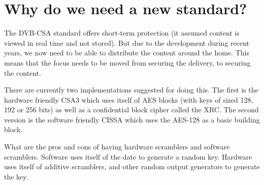 \section{Why do we need a new standard?}
The DVB-CSA standard offers short-term protection (it assumed content is viewed 
in real time and not stored). But due to the development during recent years, 
we now need to be able to distribute the content around the home. This means 
that the focus needs to be moved from securing the delivery, to securing the 
content. \citep{Farncombe}


There are currently two implementations suggested for doing this. The first is 
the hardware friendly CSA3 which uses itself of AES blocks (with keys of sized 
128, 192 or 256 bits) as well as a confidential block cipher called the XRC. The 
second version is the software friendly CISSA which uses the AES-128 as a basic 
building block. \citep{DVB:2013}

What are the pros and cons of having hardware scramblers and software scramblers.
Software uses itself of the date to generate a random key. Hardware uses itself 
of additive scramblers, and other random output generators to generate the key. 
